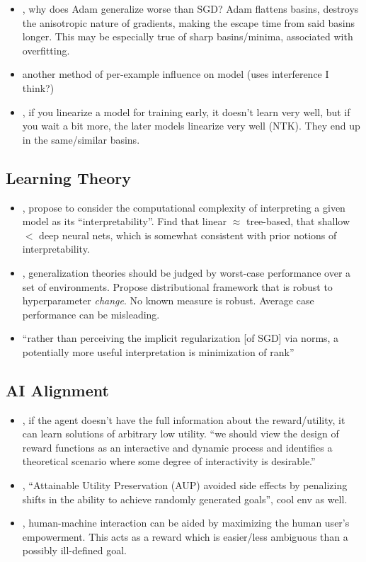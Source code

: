 \begin{itemize}
\item \citet{zhou2020towards}, why does Adam generalize worse than SGD? Adam flattens basins, destroys the anisotropic nature of gradients, making the escape time from said basins longer. This may be especially true of sharp basins/minima, associated with overfitting.
\item \citet{pruthi2020estimating} another method of per-example influence on model (uses interference I think?)
\item \citet{fort2020deep}, if you linearize a model for training early, it doesn't learn very well, but if you wait a bit more, the later models linearize very well (NTK). They end up in the same/similar basins.
\end{itemize}

\subsection{Learning Theory}
\begin{itemize}
\item \citet{barcelo2020model}, propose to consider the computational complexity of interpreting a given model as its ``interpretability''. Find that linear $\approx$ tree-based, that shallow $<$ deep neural nets, which is somewhat consistent with prior notions of interpretability.
\item \citet{dziugaite2020search}, generalization theories should be judged by worst-case performance over a set of environments. Propose distributional framework that is robust to hyperparameter \emph{change}. No known measure is robust. Average case performance can be misleading.
\item \citet{razin2020implicit} ``rather than perceiving the implicit regularization [of SGD] via norms, a potentially more useful interpretation is minimization of rank''
\end{itemize}

\subsection{AI Alignment}
\begin{itemize}
\item \citet{zhuang2020consequences}, if the agent doesn't have the full information about the reward/utility, it can learn solutions of arbitrary low utility. ``we should view the design of reward functions as an interactive and dynamic process and identifies a theoretical scenario where some degree of interactivity is desirable.''
\item \citet{turner2020avoiding}, ``Attainable Utility Preservation (AUP) avoided side effects by penalizing shifts in the ability to achieve randomly generated goals'', cool env as well.
  \item \citet{du2020ave}, human-machine interaction can be aided by maximizing the human user's empowerment. This acts as a reward which is easier/less ambiguous than a possibly ill-defined goal.
\end{itemize}

